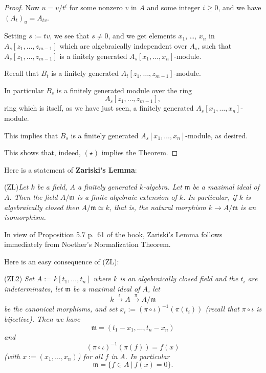 \documentclass[parskip=half,fontsize=12pt]{scrartcl}%
\newcommand{\mf}{\mathfrak}
\begin{document}
\begin{proof}
Now $u=v/t^i$ for some nonzero $v$ in $A$ and some integer $i\ge0$, and we have $(A_t)_u=A_{tv}$. 

Setting $s:=tv$, we see that $s\ne0$, and we get elements $x_1$, \dots, $x_n$ in 
$
A_s[z_1,\dots,z_{m-1}]
$ 
which are algebraically independent over $A_s$, such that 
$
A_s[z_1,\dots,z_{m-1}]
$ 
is a finitely generated $A_s[x_1,\dots,x_n]$-module. 

Recall that $B_t$ is a finitely generated $A_t[z_1,\dots,z_{m-1}]$-module. 

In particular $B_s$ is a finitely generated module over the ring $$A_s[z_1,\dots,z_{m-1}],$$ ring which is itself, as we have just seen, a finitely generated $A_s[x_1,\dots,x_n]$-module. 

This implies that $B_s$ is a finitely generated $A_s[x_1,\dots,x_n]$-module, as desired.

This shows that, indeed, $(\star)$ implies the Theorem.
\end{proof} 

Here is a statement of \textbf{Zariski's Lemma}:

(ZL)\emph{Let $k$ be a field, $A$ a finitely generated $k$-algebra. Let $\mf m$ be a maximal ideal of $A$. Then the field $A/\mf m$ is a finite algebraic extension of $k$. In particular, if $k$ is algebraically closed then $A/\mf m\simeq k$, that is, the natural morphism $k\to A/\mf m$ is an isomorphism.}

In view of Proposition 5.7 p.~61 of the book, Zariski's Lemma follows immediately from Noether's Normalization Theorem. %

Here is an easy consequence of (ZL):

(ZL2) \emph{Set $A:=k[t_1,\dots,t_n]$ where $k$ is an algebraically closed field and the $t_i$ are indeterminates, let $\mf m$ be a maximal ideal of $A$, let} 
$$
k\xrightarrow\iota A\xrightarrow{\pi}A/\mf m
$$ 
\emph{be the canonical morphisms, and set $x_i:=(\pi\circ\iota)^{-1}(\pi(t_i))$ (recall that $\pi\circ\iota$ is bijective). Then we have} 
$$
\mf m=(t_1-x_1,\dots,t_n-x_n)
$$ 
\emph{and} 
$$
(\pi\circ\iota)^{-1}(\pi(f))=f(x)
$$ 
\emph{(with $x:=(x_1,\dots,x_n)$) for all $f$ in $A$. In particular} 
$$
\mf m=\{f\in A\ |\ f(x)=0\}.
$$
\end{document}
